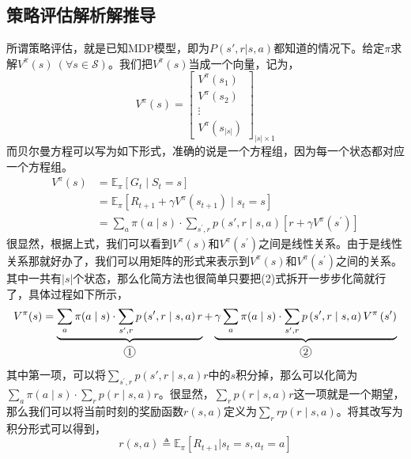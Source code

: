 \documentclass[a4paper]{article}
\newcommand*{\circled}[1]{\lower.7ex\hbox{\tikz\draw (0pt, 0pt)%
    circle (.5em) node {\makebox[1em][c]{\small #1}};}}
\begin{document}
\subsection{策略评估解析解推导}
所谓策略评估，就是已知MDP模型，即为$P(s',r|s,a)$都知道的情况下。给定$\pi$求解$V^\pi(s)\ (\forall s \in \mathcal{S})$。我们把$V^\pi(s)$当成一个向量，记为，
\begin{equation}
    V^\pi(s) = 
    \begin{bmatrix}
         V^\pi(s_1) \\
         V^\pi(s_2) \\
         \vdots \\
         V^\pi(s_{|s|})
    \end{bmatrix}_{|s|\times 1}
\end{equation}
而贝尔曼方程可以写为如下形式，准确的说是一个方程组，因为每一个状态都对应一个方程组。
\begin{equation}\begin{aligned}
V^{\pi}(s) &=\mathbb{E}_{\pi}\left[G_{t} \mid S_{t}=s\right] \\
&=\mathbb{E}_{\pi}\left[R_{t+1}+\gamma V^{\pi}\left(s_{t+1}\right) \mid s_{t}=s\right] \\
&=\sum_{a} \pi(a \mid s) \cdot \sum_{s^{\prime}, r} p\left(s' , r \mid s,a\right)\left[r+\gamma V^{\pi}\left(s^{\prime}\right)\right]
\end{aligned}\end{equation}
很显然，根据上式，我们可以看到$V^{\pi}(s)$和$V^{\pi}\left(s^{\prime}\right)$之间是线性关系。由于是线性关系那就好办了，我们可以用矩阵的形式来表示到$V^{\pi}(s)$和$V^{\pi}\left(s^{\prime}\right)$之间的关系。其中一共有$|s|$个状态，那么化简方法也很简单只要把(2)式拆开一步步化简就行了，具体过程如下所示，
\begin{equation}
    V^{\pi}(s) = \underbrace{\sum_{a} \pi(a \mid s) \cdot \sum_{s^{\prime}, r} p\left(s' , r \mid s,a\right) r}_{\circled{1}} + \underbrace{\gamma \sum_{a} \pi(a \mid s) \cdot \sum_{s^{\prime}, r} p\left(s' , r \mid s,a\right) V^{\pi}\left(s^{\prime}\right)}_{\circled{2}}
\end{equation}
其中第一项，可以将$\sum_{s^{\prime}, r} p\left(s' , r \mid s,a\right) r$中的$s$积分掉，那么可以化简为$\sum_{a} \pi(a \mid s) \cdot \sum_{ r} p\left( r \mid s,a\right) r$。很显然，$\sum_{ r} p\left( r \mid s,a\right) r$这一项就是一个期望，那么我们可以将当前时刻的奖励函数$r(s,a)$定义为$\sum_{ r} r p\left( r \mid s,a\right) $。将其改写为积分形式可以得到，
\begin{equation}
   r(s,a) \triangleq \mathbb{E}_\pi [R_{t+1}|s_t=s,a_t=a]
\end{equation}
\end{document}
